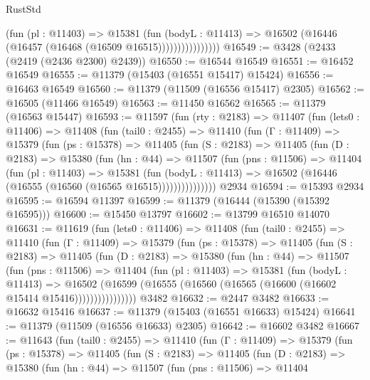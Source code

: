 \begin{lexlean}{RustStd}
\begin{coremodule}
                        (fun (pl : @11403) =>
                        @15381
                          (fun (bodyL : @11413) =>
                          @16502 (@16446 (@16457 (@16468 (@16509 @16515))))))))))))))))
@16549 := @3428 (@2433 (@2419 (@2436 @2300) @2439))
@16550 := @16544 @16549
@16551 := @16452 @16549
@16555 := @11379 (@15403 (@16551 @15417) @15424)
@16556 := @16463 @16549
@16560 := @11379 (@11509 (@16556 @15417) @2305)
@16562 := @16505 (@11466 @16549)
@16563 := @11450 @16562
@16565 := @11379 (@16563 @15447)
@16593 := @11597
    (fun (rty : @2183) =>
    @11407
      (fun (lets0 : @11406) =>
      @11408
        (fun (tail0 : @2455) =>
        @11410
          (fun (Γ : @11409) =>
          @15379
            (fun (ps : @15378) =>
            @11405
              (fun (S : @2183) =>
              @11405
                (fun (D : @2183) =>
                @15380
                  (fun (hn : @44) =>
                  @11507
                    (fun (pns : @11506) =>
                    @11404
                      (fun (pl : @11403) =>
                      @15381
                        (fun (bodyL : @11413) =>
                        @16502 (@16446 (@16555 (@16560 (@16565 @16515)))))))))))))))
    @2934
@16594 := @15393 @2934
@16595 := @16594 @11397
@16599 := @11379 (@16444 (@15390 (@15392 @16595)))
@16600 := @15450 @13797
@16602 := @13799 @16510 @14070
@16631 := @11619
    (fun (lets0 : @11406) =>
    @11408
      (fun (tail0 : @2455) =>
      @11410
        (fun (Γ : @11409) =>
        @15379
          (fun (ps : @15378) =>
          @11405
            (fun (S : @2183) =>
            @11405
              (fun (D : @2183) =>
              @15380
                (fun (hn : @44) =>
                @11507
                  (fun (pns : @11506) =>
                  @11404
                    (fun (pl : @11403) =>
                    @15381
                      (fun (bodyL : @11413) =>
                      @16502
                        (@16599
                          (@16555 (@16560 (@16565 (@16600 (@16602 @15414 @15416))))))))))))))))
    @3482
@16632 := @2447 @3482
@16633 := @16632 @15416
@16637 := @11379 (@15403 (@16551 @16633) @15424)
@16641 := @11379 (@11509 (@16556 @16633) @2305)
@16642 := @16602 @3482
@16667 := @11643
    (fun (tail0 : @2455) =>
    @11410
      (fun (Γ : @11409) =>
      @15379
        (fun (ps : @15378) =>
        @11405
          (fun (S : @2183) =>
          @11405
            (fun (D : @2183) =>
            @15380
              (fun (hn : @44) =>
              @11507
                (fun (pns : @11506) =>
                @11404

\end{coremodule}
\end{lexlean}
